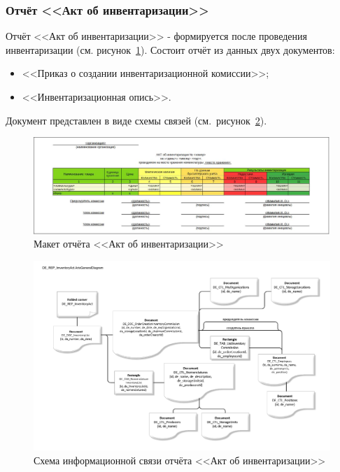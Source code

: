 \newpage
\subsubsection{Отчёт <<Акт об инвентаризации>>}

Отчёт <<Акт об инвентаризации>>
- формируется после проведения инвентаризации (см. рисунок~\ref{fig:OTC_ActNedoctachiTovara}).
Состоит отчёт из данных двух документов:
\begin{itemize}
    \item <<Приказ о создании инвентаризационной комиссии>>;
    \item <<Инвентаризационная опись>>.
\end{itemize}

Документ представлен в виде схемы связей (см.~рисунок~\ref{fig:GeneralDiagram_DE_REP_ImventoryAct}).

\begin{figure}[!h]
    \centering

    \includegraphics[width=18cm]
    {assets/layouts/OTC_ActNedoctachiTovara.jpg}

    \caption{Макет отчёта <<Акт об инвентаризации>>}
    
    \label{fig:OTC_ActNedoctachiTovara}
\end{figure}

\begin{figure}[!h]
    \centering

    \includegraphics[width=18cm]
    {assets/ARIS/GeneralDiagram/DE_REP_ImventoryAct.ArisGeneralDiagram.pdf}

    \caption{Схема информационной связи отчёта <<Акт об инвентаризации>>}

    \label{fig:GeneralDiagram_DE_REP_ImventoryAct}
\end{figure}

